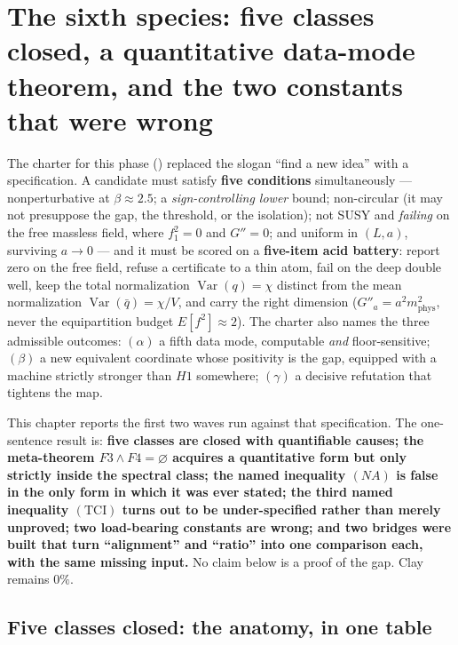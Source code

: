 \section{The sixth species: five classes closed, a quantitative data-mode
theorem, and the two constants that were wrong}
\label{ch:sixth}

The charter for this phase () replaced the slogan
``find a new idea'' with a specification. A candidate must satisfy \textbf{five conditions}
simultaneously --- nonperturbative at $\beta\approx2.5$; a \emph{sign-controlling lower} bound;
non-circular (it may not presuppose the gap, the threshold, or the isolation); not SUSY and
\emph{failing} on the free massless field, where $f_1^2=0$ and $G''=0$; and uniform in $(L,a)$,
surviving $a\to0$ --- and it must be scored on a \textbf{five-item acid battery}: report zero on the
free field, refuse a certificate to a thin atom, fail on the deep double well, keep the total
normalization $\operatorname{Var}(q)=\chi$ distinct from the mean normalization
$\operatorname{Var}(\bar q)=\chi/V$, and carry the right dimension ($G''_a=a^2m_{\mathrm{phys}}^2$,
never the equipartition budget $E[f^2]\approx2$). The charter also names the three admissible
outcomes: $(\alpha)$ a fifth data mode, computable \emph{and} floor-sensitive; $(\beta)$ a new
equivalent coordinate whose positivity is the gap, equipped with a machine strictly stronger than
$H1$ somewhere; $(\gamma)$ a decisive refutation that tightens the map.

This chapter reports the first two waves run against that specification. The one-sentence result
is: \textbf{five classes are closed with quantifiable causes; the meta-theorem $F3\wedge F4=\varnothing$
acquires a quantitative form but only strictly inside the spectral class; the named inequality
$(NA)$ is false in the only form in which it was ever stated; the third named inequality
$(\mathrm{TCI})$ turns out to be under-specified rather than merely unproved; two load-bearing
constants are wrong; and two bridges were built that turn ``alignment'' and ``ratio'' into one
comparison each, with the same missing input.} No claim below is a proof of the gap. Clay remains
$0\%$.

\subsection{Five classes closed: the anatomy, in one table}

